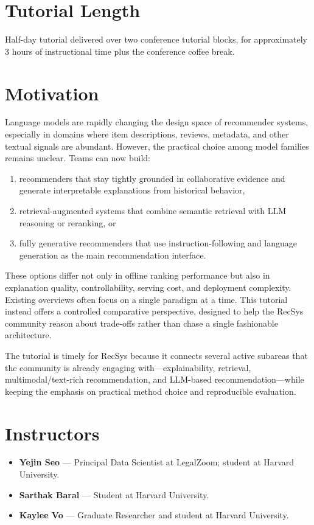 \documentclass[sigconf,nonacm]{acmart}
\begin{document}
\maketitle

\section{Tutorial Length}
Half-day tutorial delivered over two conference tutorial blocks, for approximately 3 hours of instructional time plus the conference coffee break.

\section{Motivation}
Language models are rapidly changing the design space of recommender systems, especially in domains where item descriptions, reviews, metadata, and other textual signals are abundant.
However, the practical choice among model families remains unclear.
Teams can now build:
\begin{enumerate}
    \item recommenders that stay tightly grounded in collaborative evidence and generate interpretable explanations from historical behavior,
    \item retrieval-augmented systems that combine semantic retrieval with LLM reasoning or reranking, or
    \item fully generative recommenders that use instruction-following and language generation as the main recommendation interface.
\end{enumerate}

These options differ not only in offline ranking performance but also in explanation quality, controllability, serving cost, and deployment complexity.
Existing overviews often focus on a single paradigm at a time.
This tutorial instead offers a controlled comparative perspective, designed to help the RecSys community reason about trade-offs rather than chase a single fashionable architecture.

The tutorial is timely for RecSys because it connects several active subareas that the community is already engaging with---explainability, retrieval, multimodal/text-rich recommendation, and LLM-based recommendation---while keeping the emphasis on practical method choice and reproducible evaluation.

\section{Instructors}
\begin{itemize}
    \item \textbf{Yejin Seo} --- Principal Data Scientist at LegalZoom; student at Harvard University.
    \item \textbf{Sarthak Baral} --- Student at Harvard University.
    \item \textbf{Kaylee Vo} --- Graduate Researcher and student at Harvard University.
\end{itemize}
\end{document}
